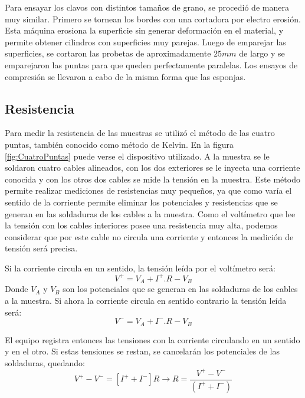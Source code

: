 \documentclass[a4paper,12pt,fleqn,twoside,openany]{book}
\begin{document}
Para ensayar los clavos con distintos tamaños de grano, se procedió de manera muy similar. Primero se tornean los bordes con una cortadora por electro erosión. Esta máquina erosiona la superficie sin generar deformación en el material, y permite obtener cilindros con superficies muy parejas. Luego de emparejar las superficies, se cortaron las probetas de aproximadamente $25 mm$ de largo y se emparejaron las puntas para que queden perfectamente paralelas. 
Los ensayos de compresión se llevaron a cabo de la misma forma que las esponjas. 
 
 
 

\subsection{Resistencia} \label{CuatroPuntas}


Para medir la resistencia de las muestras se utilizó el método de las cuatro puntas, también conocido como método de Kelvin. En la figura 
\ref{fig:CuatroPuntas} puede 
verse el dispositivo utilizado. A la muestra se le soldaron cuatro cables alineados, con los dos exteriores se le inyecta una corriente conocida y con los 
otros dos cables se mide la tensión en la muestra. Este método permite realizar mediciones de resistencias muy pequeños, ya que como varía
el sentido de la corriente permite eliminar los potenciales y resistencias que se generan en las soldaduras de los cables a la muestra.
Como el voltímetro que lee la tensión con los cables interiores posee una resistencia muy alta, podemos considerar que por este cable no circula una corriente
y entonces la medición de tensión será precisa. 

Si la corriente circula en un sentido, la tensión leída por el voltímetro será:
\begin{equation}
 V^+= V_A +I^+ . R - V_B 
\end{equation}
Donde $V_A$ y $V_B$ son los potenciales que se generan en las soldaduras de los cables a la muestra. Si ahora la corriente circula en sentido contrario la tensión leída será:
\begin{equation}
 V^-= V_A +I^- . R - V_B 
\end{equation}

El equipo registra entonces las tensiones con la corriente circulando en un sentido y en el otro. Si estas tensiones se restan, se cancelarán los potenciales 
de las soldaduras, quedando:  
\begin{equation}
 V^+ - V^-= [I^+ + I^-] R \longrightarrow R=\frac{V^+ - V^-}{(I^+ + I^-)}
\end{equation}
\end{document}
